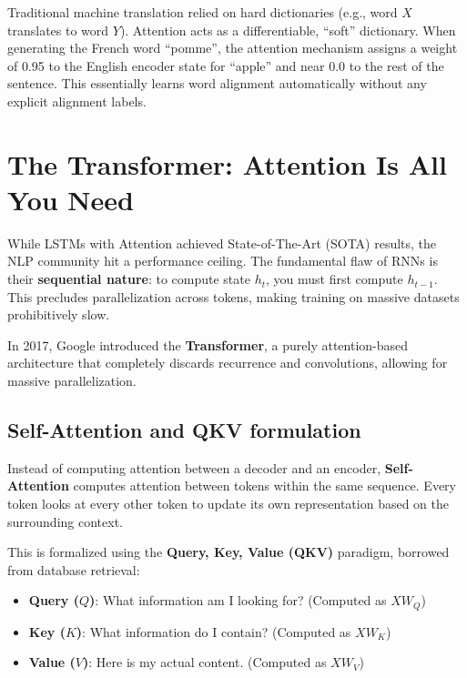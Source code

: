 \begin{insightbox}
Traditional machine translation relied on hard dictionaries (e.g., word $X$ translates to word $Y$). Attention acts as a differentiable, ``soft'' dictionary. When generating the French word ``pomme'', the attention mechanism assigns a weight of 0.95 to the English encoder state for ``apple'' and near 0.0 to the rest of the sentence. This essentially learns word alignment automatically without any explicit alignment labels.
\end{insightbox}

\section{The Transformer: Attention Is All You Need}
\label{sec:transformer_arch}

While LSTMs with Attention achieved State-of-The-Art (SOTA) results, the NLP community hit a performance ceiling. The fundamental flaw of RNNs is their \textbf{sequential nature}: to compute state $h_t$, you must first compute $h_{t-1}$. This precludes parallelization across tokens, making training on massive datasets prohibitively slow. 

In 2017, Google introduced the \textbf{Transformer}, a purely attention-based architecture that completely discards recurrence and convolutions, allowing for massive parallelization.

\subsection{Self-Attention and QKV formulation}
Instead of computing attention between a decoder and an encoder, \textbf{Self-Attention} computes attention between tokens within the same sequence. Every token looks at every other token to update its own representation based on the surrounding context.

This is formalized using the \textbf{Query, Key, Value (QKV)} paradigm, borrowed from database retrieval:
\begin{itemize}
    \item \textbf{Query ($Q$)}: What information am I looking for? (Computed as $X W_Q$)
    \item \textbf{Key ($K$)}: What information do I contain? (Computed as $X W_K$)
    \item \textbf{Value ($V$)}: Here is my actual content. (Computed as $X W_V$)
\end{itemize}

